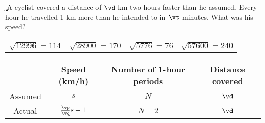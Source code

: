 

\LCM\va\vb\vc
\MULTIPLY{}\vd %
\ADD{}\ve 
\SUBTRACT{}\a
\FRACTIONSIMPLIFY\a\va\vp\vq
\FRACMULT\vp{}\vr\vs
\FRACMULT\vp\vq{}\k\m %
\SUBTRACT\k\ve\c 
\FRACMULT\a{}\vt\b %

\MULTIPLY\vd\vs\d %
\MULTIPLY\c\vs\b %

\question[5] A cyclist covered a distance of $\vd$ km two hours faster than he assumed. Every hour
he travelled 1 km more than he intended to in $\vt$ minutes. What was his speed?

\watchout

\begin{calcaid}
  \begin{tabular}{c c c c} 
    $\sqrt{12996}=114$ & $\sqrt{28900}=170$ & 
    $\sqrt{5776}=76$ & $\sqrt{57600}=240$
  \end{tabular}
\end{calcaid}

\ifprintanswers
  	\begin{tabular}{cccc}
  	    \toprule
  		& Speed (km/h) & Number of 1-hour periods & Distance covered \\
  		\midrule
  		Assumed & $s$ & $N$ & $\vd$ \\
  		Actual & $\frac\vp\vq s + 1$ & $N-2$ & $\vd$ \\
  		\bottomrule
  	\end{tabular}
\fi 

